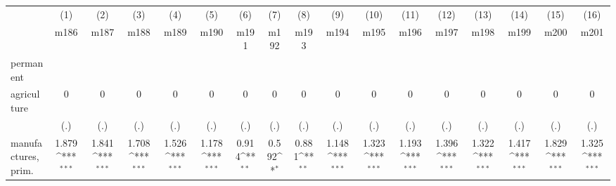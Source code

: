 {
\def\sym#1{\ifmmode^{#1}\else\(^{#1}\)\fi}
\begin{tabular}{l*{16}{c}}
\hline\hline
                    &\multicolumn{1}{c}{(1)}&\multicolumn{1}{c}{(2)}&\multicolumn{1}{c}{(3)}&\multicolumn{1}{c}{(4)}&\multicolumn{1}{c}{(5)}&\multicolumn{1}{c}{(6)}&\multicolumn{1}{c}{(7)}&\multicolumn{1}{c}{(8)}&\multicolumn{1}{c}{(9)}&\multicolumn{1}{c}{(10)}&\multicolumn{1}{c}{(11)}&\multicolumn{1}{c}{(12)}&\multicolumn{1}{c}{(13)}&\multicolumn{1}{c}{(14)}&\multicolumn{1}{c}{(15)}&\multicolumn{1}{c}{(16)}\\
                    &\multicolumn{1}{c}{m186}&\multicolumn{1}{c}{m187}&\multicolumn{1}{c}{m188}&\multicolumn{1}{c}{m189}&\multicolumn{1}{c}{m190}&\multicolumn{1}{c}{m191}&\multicolumn{1}{c}{m192}&\multicolumn{1}{c}{m193}&\multicolumn{1}{c}{m194}&\multicolumn{1}{c}{m195}&\multicolumn{1}{c}{m196}&\multicolumn{1}{c}{m197}&\multicolumn{1}{c}{m198}&\multicolumn{1}{c}{m199}&\multicolumn{1}{c}{m200}&\multicolumn{1}{c}{m201}\\
\hline
permanent           &                     &                     &                     &                     &                     &                     &                     &                     &                     &                     &                     &                     &                     &                     &                     &                     \\
agriculture         &           0         &           0         &           0         &           0         &           0         &           0         &           0         &           0         &           0         &           0         &           0         &           0         &           0         &           0         &           0         &           0         \\
                    &         (.)         &         (.)         &         (.)         &         (.)         &         (.)         &         (.)         &         (.)         &         (.)         &         (.)         &         (.)         &         (.)         &         (.)         &         (.)         &         (.)         &         (.)         &         (.)         \\
[1em]
manufactures, prim. &       1.879\sym{***}&       1.841\sym{***}&       1.708\sym{***}&       1.526\sym{***}&       1.178\sym{***}&       0.914\sym{**} &       0.592\sym{*}  &       0.881\sym{**} &       1.148\sym{***}&       1.323\sym{***}&       1.193\sym{***}&       1.396\sym{***}&       1.322\sym{***}&       1.417\sym{***}&       1.829\sym{***}&       1.325\sym{***}\\

\end{tabular}}

